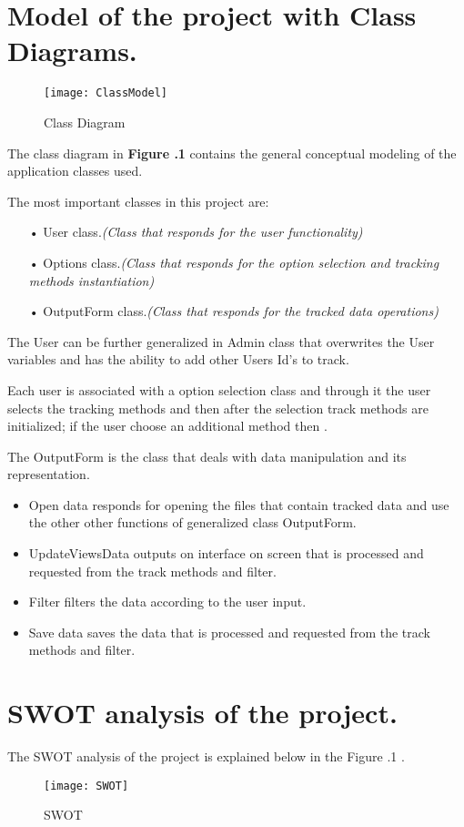 
\setlength{\parindent}{2ex}
\section{Model of the project with Class Diagrams.}
\begin{figure}[h!]
	\centering
	\texttt{[image: ClassModel]}
	\caption{Class Diagram} 
\end{figure}
The class diagram in \textbf{Figure \thesection.1} contains the general conceptual modeling of the application classes used.
\par
The most important classes in this project are:
\begin{itemize}
\item[•] User class.\textit{(Class that responds for the user functionality)}
\item[•] Options class.\textit{(Class that responds for the option selection and tracking methods instantiation)}
\item[•] OutputForm class.\textit{(Class that responds for the tracked data operations)}
\end{itemize}
The User can be further generalized in Admin class that overwrites the User variables and has the ability to add other Users Id's to track.
\par
Each user is associated with a option selection class and through it the user selects the tracking methods and then after the selection track methods are initialized; if the user choose an additional method then .
\par
The OutputForm is the class that deals with data manipulation and its representation.
\begin{itemize}
\item Open data responds for opening the files that contain tracked data and use the other other functions of generalized class OutputForm. 
\item UpdateViewsData outputs on interface on screen that is processed and requested from the track methods and filter.
\item Filter filters the data according to the user input.
\item Save data saves the data that is processed and requested from the track methods and filter.
\end{itemize}



\section{SWOT analysis of the project.}
The SWOT analysis of the project is explained below in the Figure \thesection.1 .
\begin{figure}[h!]
	\centering
	\texttt{[image: SWOT]}
	\caption{SWOT} 
\end{figure}
\clearpage
